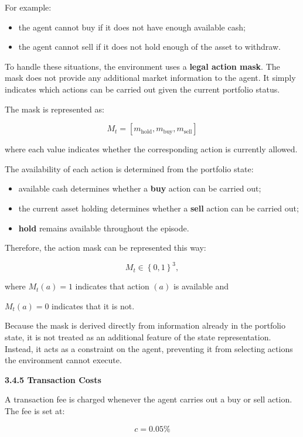 For example:

\begin{itemize}
\item
  the agent cannot buy if it does not have enough available cash;
\item
  the agent cannot sell if it does not hold enough of the asset to
  withdraw.
\end{itemize}

To handle these situations, the environment uses a \textbf{legal action
mask}. The mask does not provide any additional market information to
the agent. It simply indicates which actions can be carried out given
the current portfolio status.

The mask is represented as:

\[M_{t} = \left\lbrack m_{\text{hold}},m_{\text{buy}},m_{\text{sell}} \right\rbrack\]

where each value indicates whether the corresponding action is currently
allowed.

The availability of each action is determined from the portfolio state:

\begin{itemize}
\item
  available cash determines whether a \textbf{buy} action can be carried
  out;
\item
  the current asset holding determines whether a \textbf{sell} action
  can be carried out;
\item
  \textbf{hold} remains available throughout the episode.
\end{itemize}

Therefore, the action mask can be represented this way:

\[M_{t} \in \left\{ 0,1 \right\}^{3},\]

where \(M_{t}(a) = 1\) indicates that action \((a)\) is available and

\(M_{t}(a) = 0\) indicates that it is not.

Because the mask is derived directly from information already in the
portfolio state, it is not treated as an additional feature of the state
representation. Instead, it acts as a constraint on the agent,
preventing it from selecting actions the environment cannot execute.

\textbf{3.4.5 Transaction Costs}

A transaction fee is charged whenever the agent carries out a buy or
sell action. The fee is set at:

\[c = 0.05\%\]

